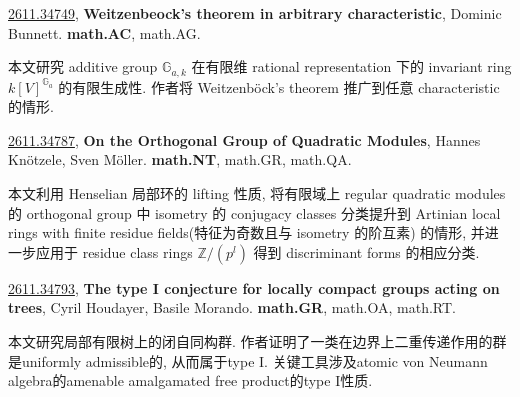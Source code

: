 \documentclass[9pt, a4paper]{article}
\theoremstyle{plain}
\theoremstyle{definition}
\theoremstyle{remark}
\newcommand{\arxivwithtarget}[3]{\hypertarget{#1}{}\href{https://arxiv.org/abs/#1}{#1}, \textbf{\textcolor{arxivblue}{#2}}, #3. }
\begin{document}
\arxivwithtarget{2611.34749}{Weitzenbeock's theorem in arbitrary characteristic}{Dominic Bunnett}\textbf{math.AC}, math.AG.

本文研究 additive group \(\mathbb{G}_{a,k}\) 在有限维 rational representation 下的 invariant ring \(k[V]^{\mathbb{G}_a}\) 的有限生成性. 作者将 Weitzenböck's theorem 推广到任意 characteristic 的情形.


\arxivwithtarget{2611.34787}{On the Orthogonal Group of Quadratic Modules}{Hannes Knötzele, Sven Möller}\textbf{math.NT}, math.GR, math.QA.

本文利用 Henselian 局部环的 lifting 性质, 将有限域上 regular quadratic modules 的 orthogonal group 中 isometry 的 conjugacy classes 分类提升到 Artinian local rings with finite residue fields(特征为奇数且与 isometry 的阶互素) 的情形, 并进一步应用于 residue class rings $\mathbb{Z}/(p^l)$ 得到 discriminant forms 的相应分类.


\arxivwithtarget{2611.34793}{The type I conjecture for locally compact groups acting on trees}{Cyril Houdayer, Basile Morando}\textbf{math.GR}, math.OA, math.RT.

本文研究局部有限树上的闭自同构群. 作者证明了一类在边界上二重传递作用的群是uniformly admissible的, 从而属于type I. 关键工具涉及atomic von Neumann algebra的amenable amalgamated free product的type I性质.


    

\end{document}
